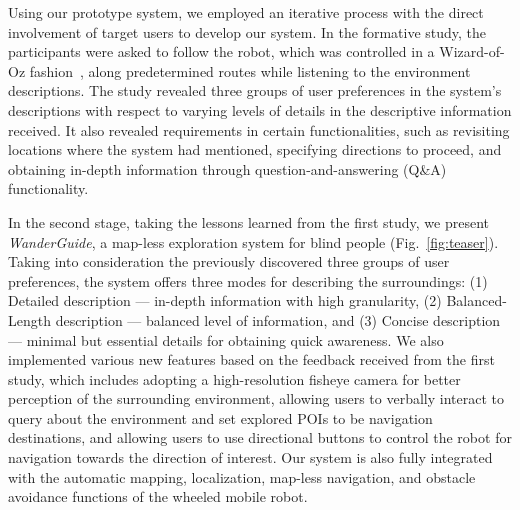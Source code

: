 
Using our prototype system, we employed an iterative process with the direct involvement of target users to develop our system. 
In the formative study, the participants were asked to follow the robot, which was controlled in a Wizard-of-Oz fashion~\cite{riek2012wizard-of-oz}, along predetermined routes while listening to the environment descriptions.
The study revealed three groups of user preferences in the system's descriptions with respect to varying levels of details in the descriptive information received.
It also revealed requirements in certain functionalities, such as revisiting locations where the system had mentioned, specifying directions to proceed, and obtaining in-depth information through question-and-answering (Q\&A) functionality.

In the second stage, taking the lessons learned from the first study, we present \textit{WanderGuide}, a map-less exploration system for blind people (Fig.~\ref{fig:teaser}).
Taking into consideration the previously discovered three groups of user preferences, the system offers three modes for describing the surroundings: (1) Detailed description --- in-depth information with high granularity, (2) Balanced-Length description --- balanced level of information, and (3) Concise description --- minimal but essential details for obtaining quick awareness. 
We also implemented various new features based on the feedback received from the first study, which includes adopting a high-resolution fisheye camera for better perception of the surrounding environment, allowing users to verbally interact to query about the environment and set explored POIs to be navigation destinations, and allowing users to use directional buttons to control the robot for navigation towards the direction of interest. 
Our system is also fully integrated with the automatic mapping, localization, map-less navigation, and obstacle avoidance functions of the wheeled mobile robot.

